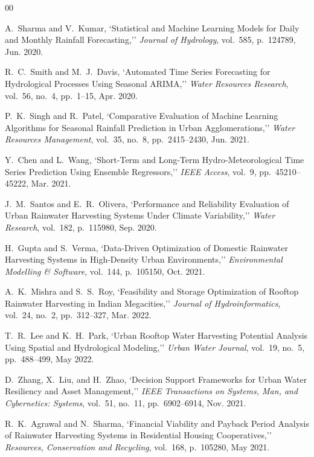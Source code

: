 ﻿\documentclass[conference]{IEEEtran}
\begin{document}
\begin{thebibliography}{00}

A.~Sharma and V.~Kumar, `Statistical and Machine Learning Models for Daily and Monthly Rainfall Forecasting,'' \textit{Journal of Hydrology}, vol.~585, p.~124789, Jun. 2020.

R.~C.~Smith and M.~J.~Davis, `Automated Time Series Forecasting for Hydrological Processes Using Seasonal ARIMA,'' \textit{Water Resources Research}, vol.~56, no.~4, pp.~1--15, Apr. 2020.

P.~K.~Singh and R.~Patel, `Comparative Evaluation of Machine Learning Algorithms for Seasonal Rainfall Prediction in Urban Agglomerations,'' \textit{Water Resources Management}, vol.~35, no.~8, pp.~2415--2430, Jun. 2021.

Y.~Chen and L.~Wang, `Short-Term and Long-Term Hydro-Meteorological Time Series Prediction Using Ensemble Regressors,'' \textit{IEEE Access}, vol.~9, pp.~45210--45222, Mar. 2021.

J.~M.~Santos and E.~R.~Olivera, `Performance and Reliability Evaluation of Urban Rainwater Harvesting Systems Under Climate Variability,'' \textit{Water Research}, vol.~182, p.~115980, Sep. 2020.

H.~Gupta and S.~Verma, `Data-Driven Optimization of Domestic Rainwater Harvesting Systems in High-Density Urban Environments,'' \textit{Environmental Modelling \& Software}, vol.~144, p.~105150, Oct. 2021.

A.~K.~Mishra and S.~S.~Roy, `Feasibility and Storage Optimization of Rooftop Rainwater Harvesting in Indian Megacities,'' \textit{Journal of Hydroinformatics}, vol.~24, no.~2, pp.~312--327, Mar. 2022.

T.~R.~Lee and K.~H.~Park, `Urban Rooftop Water Harvesting Potential Analysis Using Spatial and Hydrological Modeling,'' \textit{Urban Water Journal}, vol.~19, no.~5, pp.~488--499, May 2022.

D.~Zhang, X.~Liu, and H.~Zhao, `Decision Support Frameworks for Urban Water Resiliency and Asset Management,'' \textit{IEEE Transactions on Systems, Man, and Cybernetics: Systems}, vol.~51, no.~11, pp.~6902--6914, Nov. 2021.

R.~K.~Agrawal and N.~Sharma, `Financial Viability and Payback Period Analysis of Rainwater Harvesting Systems in Residential Housing Cooperatives,'' \textit{Resources, Conservation and Recycling}, vol.~168, p.~105280, May 2021.


\end{thebibliography}
\end{document}
